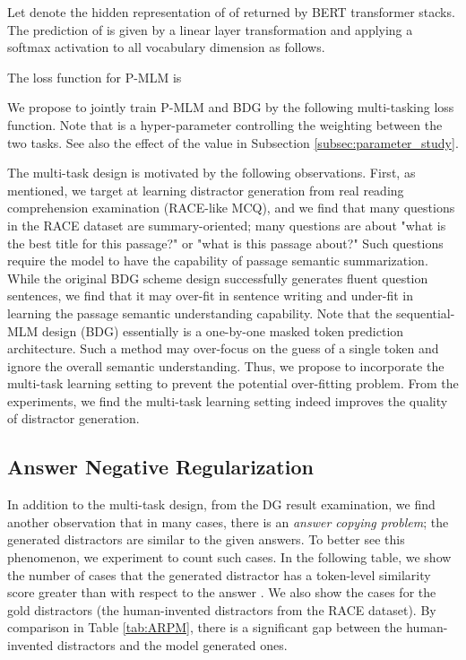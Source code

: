 \documentclass[11pt,a4paper]{article}
\begin{document}
Let  denote the hidden representation of  of  returned by BERT transformer stacks. The prediction of  is given by a linear layer transformation  and applying a softmax activation to all vocabulary dimension as follows.  
 

The loss function for P-MLM is 




We propose to jointly train P-MLM and BDG by the following multi-tasking loss function. Note that  is a hyper-parameter controlling the weighting between the two tasks. See also the effect of the  value in Subsection \ref{subsec:parameter_study}. 








The multi-task design is motivated by the following observations. First, as mentioned, we target at learning distractor generation from real reading comprehension examination (RACE-like MCQ), and we find that many questions in the RACE dataset are summary-oriented; many questions are about "what is the best title for this passage?" or "what is this passage about?" Such questions require the model to have the capability of passage semantic summarization. While the original BDG scheme design successfully generates fluent question sentences, we find that it may over-fit in sentence writing and under-fit in learning the passage semantic understanding capability. Note that the sequential-MLM design (BDG) essentially is a one-by-one masked token prediction architecture. Such a method may over-focus on the guess of a single token and ignore the overall semantic understanding. Thus, we propose to incorporate the multi-task learning setting to prevent the potential over-fitting problem. From the experiments, we find the multi-task learning setting indeed improves the quality of distractor generation. 

 
\subsection{Answer Negative Regularization}
In addition to the multi-task design, from the DG result examination, we find another observation that in many cases, there is an \textit{answer copying problem}; the generated distractors are similar to the given answers. To better see this phenomenon, we experiment to count such cases. In the following table, we show the number of cases that the generated distractor  has a token-level similarity score greater than  with respect to the answer . We also show the cases for the gold distractors (the human-invented distractors from the RACE dataset). By comparison in Table \ref{tab:ARPM}, there is a significant gap between the human-invented distractors and the model generated ones. 
\end{document}
